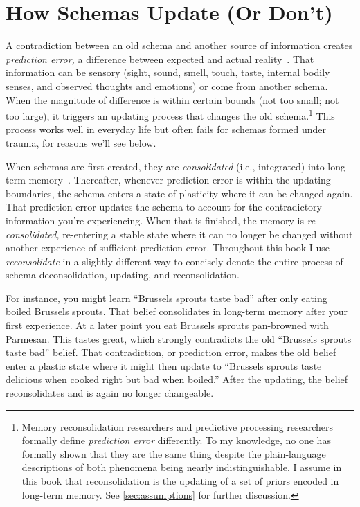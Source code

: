 \documentclass[11pt,oneside]{book}
\let\cite\parencite
\begin{document}
\section{How Schemas Update (Or Don't)}
\label{sec:mechanism}
A contradiction between an old schema and another source of information creates \textit{prediction error,} a difference between expected and actual reality~\cite{eckerUnlocking}. That information can be sensory (sight, sound, smell, touch, taste, internal bodily senses, and observed thoughts and emotions) or come from another schema. When the magnitude of difference is within certain bounds (not too small; not too large), it triggers an updating process that changes the old schema.\footnote{Memory reconsolidation researchers and predictive processing researchers formally define \textit{prediction error} differently. To my knowledge, no one has formally shown that they are the same thing despite the plain-language descriptions of both phenomena being nearly indistinguishable. I assume in this book that reconsolidation is the updating of a set of priors encoded in long-term memory. See \cref{sec:assumptions} for further discussion.} This process works well in everyday life but often fails for schemas formed under trauma, for reasons we'll see below.

When schemas are first created, they are \textit{consolidated} (i.e., integrated) into long-term memory~\cite{eckerUnlocking}. Thereafter, whenever prediction error is within the updating boundaries, the schema enters a state of plasticity where it can be changed again. That prediction error updates the schema to account for the contradictory information you're experiencing. When that is finished, the memory is \textit{re-consolidated,} re-entering a stable state where it can no longer be changed without another experience of sufficient prediction error. Throughout this book I use \textit{reconsolidate} in a slightly different way to concisely denote the entire process of schema deconsolidation, updating, and reconsolidation.

For instance, you might learn \enquote{Brussels sprouts taste bad} after only eating boiled Brussels sprouts. That belief consolidates in long-term memory after your first experience. At a later point you eat Brussels sprouts pan-browned with Parmesan. This tastes great, which strongly contradicts the old \enquote{Brussels sprouts taste bad} belief. That contradiction, or prediction error, makes the old belief enter a plastic state where it might then update to \enquote{Brussels sprouts taste delicious when cooked right but bad when boiled.} After the updating, the belief reconsolidates and is again no longer changeable.
\end{document}
